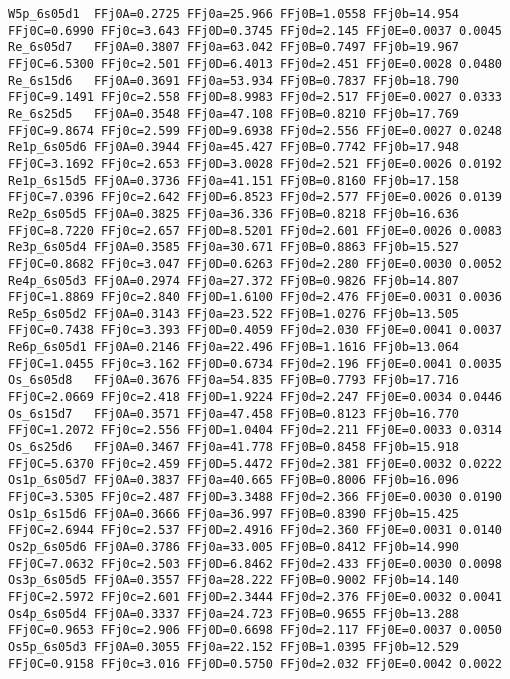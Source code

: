 {\begin{verbatim}
W5p_6s05d1  FFj0A=0.2725 FFj0a=25.966 FFj0B=1.0558 FFj0b=14.954 FFj0C=0.6990 FFj0c=3.643 FFj0D=0.3745 FFj0d=2.145 FFj0E=0.0037 0.0045
Re_6s05d7   FFj0A=0.3807 FFj0a=63.042 FFj0B=0.7497 FFj0b=19.967 FFj0C=6.5300 FFj0c=2.501 FFj0D=6.4013 FFj0d=2.451 FFj0E=0.0028 0.0480
Re_6s15d6   FFj0A=0.3691 FFj0a=53.934 FFj0B=0.7837 FFj0b=18.790 FFj0C=9.1491 FFj0c=2.558 FFj0D=8.9983 FFj0d=2.517 FFj0E=0.0027 0.0333
Re_6s25d5   FFj0A=0.3548 FFj0a=47.108 FFj0B=0.8210 FFj0b=17.769 FFj0C=9.8674 FFj0c=2.599 FFj0D=9.6938 FFj0d=2.556 FFj0E=0.0027 0.0248
Re1p_6s05d6 FFj0A=0.3944 FFj0a=45.427 FFj0B=0.7742 FFj0b=17.948 FFj0C=3.1692 FFj0c=2.653 FFj0D=3.0028 FFj0d=2.521 FFj0E=0.0026 0.0192
Re1p_6s15d5 FFj0A=0.3736 FFj0a=41.151 FFj0B=0.8160 FFj0b=17.158 FFj0C=7.0396 FFj0c=2.642 FFj0D=6.8523 FFj0d=2.577 FFj0E=0.0026 0.0139
Re2p_6s05d5 FFj0A=0.3825 FFj0a=36.336 FFj0B=0.8218 FFj0b=16.636 FFj0C=8.7220 FFj0c=2.657 FFj0D=8.5201 FFj0d=2.601 FFj0E=0.0026 0.0083
Re3p_6s05d4 FFj0A=0.3585 FFj0a=30.671 FFj0B=0.8863 FFj0b=15.527 FFj0C=0.8682 FFj0c=3.047 FFj0D=0.6263 FFj0d=2.280 FFj0E=0.0030 0.0052
Re4p_6s05d3 FFj0A=0.2974 FFj0a=27.372 FFj0B=0.9826 FFj0b=14.807 FFj0C=1.8869 FFj0c=2.840 FFj0D=1.6100 FFj0d=2.476 FFj0E=0.0031 0.0036
Re5p_6s05d2 FFj0A=0.3143 FFj0a=23.522 FFj0B=1.0276 FFj0b=13.505 FFj0C=0.7438 FFj0c=3.393 FFj0D=0.4059 FFj0d=2.030 FFj0E=0.0041 0.0037
Re6p_6s05d1 FFj0A=0.2146 FFj0a=22.496 FFj0B=1.1616 FFj0b=13.064 FFj0C=1.0455 FFj0c=3.162 FFj0D=0.6734 FFj0d=2.196 FFj0E=0.0041 0.0035
Os_6s05d8   FFj0A=0.3676 FFj0a=54.835 FFj0B=0.7793 FFj0b=17.716 FFj0C=2.0669 FFj0c=2.418 FFj0D=1.9224 FFj0d=2.247 FFj0E=0.0034 0.0446
Os_6s15d7   FFj0A=0.3571 FFj0a=47.458 FFj0B=0.8123 FFj0b=16.770 FFj0C=1.2072 FFj0c=2.556 FFj0D=1.0404 FFj0d=2.211 FFj0E=0.0033 0.0314
Os_6s25d6   FFj0A=0.3467 FFj0a=41.778 FFj0B=0.8458 FFj0b=15.918 FFj0C=5.6370 FFj0c=2.459 FFj0D=5.4472 FFj0d=2.381 FFj0E=0.0032 0.0222
Os1p_6s05d7 FFj0A=0.3837 FFj0a=40.665 FFj0B=0.8006 FFj0b=16.096 FFj0C=3.5305 FFj0c=2.487 FFj0D=3.3488 FFj0d=2.366 FFj0E=0.0030 0.0190
Os1p_6s15d6 FFj0A=0.3666 FFj0a=36.997 FFj0B=0.8390 FFj0b=15.425 FFj0C=2.6944 FFj0c=2.537 FFj0D=2.4916 FFj0d=2.360 FFj0E=0.0031 0.0140
Os2p_6s05d6 FFj0A=0.3786 FFj0a=33.005 FFj0B=0.8412 FFj0b=14.990 FFj0C=7.0632 FFj0c=2.503 FFj0D=6.8462 FFj0d=2.433 FFj0E=0.0030 0.0098
Os3p_6s05d5 FFj0A=0.3557 FFj0a=28.222 FFj0B=0.9002 FFj0b=14.140 FFj0C=2.5972 FFj0c=2.601 FFj0D=2.3444 FFj0d=2.376 FFj0E=0.0032 0.0041
Os4p_6s05d4 FFj0A=0.3337 FFj0a=24.723 FFj0B=0.9655 FFj0b=13.288 FFj0C=0.9653 FFj0c=2.906 FFj0D=0.6698 FFj0d=2.117 FFj0E=0.0037 0.0050
Os5p_6s05d3 FFj0A=0.3055 FFj0a=22.152 FFj0B=1.0395 FFj0b=12.529 FFj0C=0.9158 FFj0c=3.016 FFj0D=0.5750 FFj0d=2.032 FFj0E=0.0042 0.0022

\end{verbatim}}
